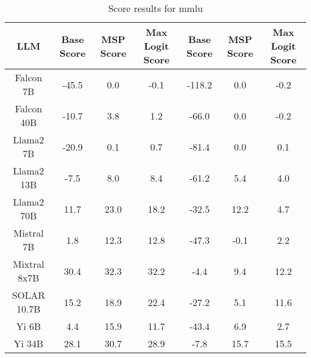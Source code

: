 \renewcommand\arraystretch{1.2}
\begin{table*}
\centering
\begin{tabular}{c|c|c|c|c|c|c}
LLM & Base Score & MSP Score & Max Logit Score & Base Score & MSP Score & Max Logit Score\\ \hline
Falcon 7B & -45.5 & 0.0 & -0.1 & -118.2 & 0.0 & -0.2\\
Falcon 40B & -10.7 & 3.8 & 1.2 & -66.0 & 0.0 & -0.2\\
Llama2 7B & -20.9 & 0.1 & 0.7 & -81.4 & 0.0 & 0.1\\
Llama2 13B & -7.5 & 8.0 & 8.4 & -61.2 & 5.4 & 4.0\\
Llama2 70B & 11.7 & 23.0 & 18.2 & -32.5 & 12.2 & 4.7\\
Mistral 7B & 1.8 & 12.3 & 12.8 & -47.3 & -0.1 & 2.2\\
Mixtral 8x7B & 30.4 & 32.3 & 32.2 & -4.4 & 9.4 & 12.2\\
SOLAR 10.7B & 15.2 & 18.9 & 22.4 & -27.2 & 5.1 & 11.6\\
Yi 6B & 4.4 & 15.9 & 11.7 & -43.4 & 6.9 & 2.7\\
Yi 34B & 28.1 & 30.7 & 28.9 & -7.8 & 15.7 & 15.5\\
\hline
\end{tabular}
\caption{Score results for mmlu}
\end{table*}
\label{tab:mmlu_score}
